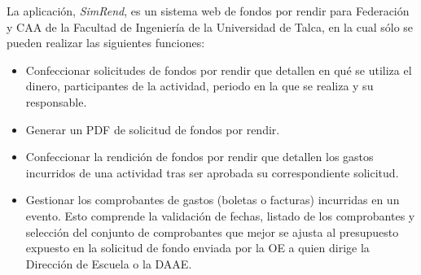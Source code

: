 La aplicación, \emph{SimRend}, es un sistema web de fondos por rendir para Federación y CAA de la Facultad de Ingeniería de la Universidad de Talca, en la cual sólo se pueden realizar las siguientes funciones:

\begin{itemize}
    \item Confeccionar solicitudes de fondos por rendir que detallen en qué se utiliza el dinero, participantes de la actividad, periodo en la que se realiza y su responsable.
    
    \item Generar un PDF de solicitud de fondos por rendir.

    \item Confeccionar la rendición de fondos por rendir que detallen los gastos incurridos de una actividad tras ser aprobada su correspondiente solicitud.
    
    \item Gestionar los comprobantes de gastos (boletas o facturas) incurridas en un evento. Esto comprende la validación de fechas, listado de los comprobantes y selección del conjunto de comprobantes que mejor se ajusta al presupuesto expuesto en la solicitud de fondo enviada por la OE a quien dirige la Dirección de Escuela o la DAAE.
    
\end{itemize}